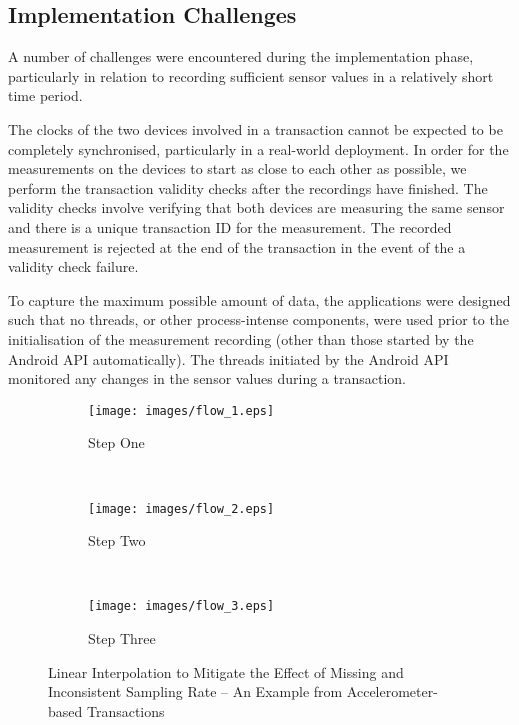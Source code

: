 \documentclass{article}
\begin{document}
\subsection{Implementation Challenges}
\label{sec:ImplementationChallenges}
A number of challenges were encountered during the implementation phase, particularly in relation to recording sufficient sensor values in a relatively short time period.


 The clocks of the two devices involved in a transaction cannot be expected to be completely synchronised, particularly in a real-world deployment.
		In order for the measurements on the devices to start as close to each other as possible, we perform the transaction validity checks after the recordings have finished. The validity checks involve verifying that both devices are measuring the same sensor and there is a unique transaction ID for the measurement. The recorded measurement is rejected at the end of the transaction in the event of the a validity check failure.

To capture the maximum possible amount of data, the applications were designed such that no threads, or other process-intense components, were used prior to the initialisation of the measurement recording (other than those started by the Android API automatically).
		The threads initiated by the Android API monitored any changes in the sensor values during a transaction.


\begin{figure*}
    \centering
    \begin{subfigure}[b]{0.31\textwidth}
        \texttt{[image: images/flow\_1.eps]}
        \caption{Step One}
        \label{fig:Step_One}
    \end{subfigure}
    ~ \begin{subfigure}[b]{0.31\textwidth}
        \texttt{[image: images/flow\_2.eps]}
        \caption{Step Two}
        \label{fig:Step_Two}
    \end{subfigure}
    ~ \begin{subfigure}[b]{0.31\textwidth}
        \texttt{[image: images/flow\_3.eps]}
        \caption{Step Three}
        \label{fig:Step_Three}
    \end{subfigure}
    \caption{Linear Interpolation to Mitigate the Effect of Missing and Inconsistent Sampling Rate -- An Example from Accelerometer-based Transactions}\label{fig:workflow}
\end{figure*}
\end{document}
